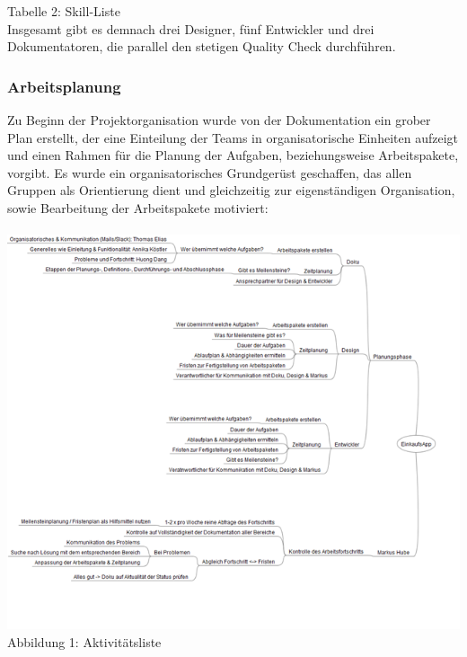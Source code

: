 \documentclass[12pt,a4paper]{article}
\begin{document}
%

\footnotesize Tabelle 2: Skill-Liste
\normalsize
\\
\linebreak
\newline
\newline
Insgesamt gibt es demnach drei Designer, fünf Entwickler und drei Dokumentatoren, die parallel den stetigen Quality Check durchführen.
\newpage

\subsubsection{Arbeitsplanung}
Zu Beginn der Projektorganisation wurde von der Dokumentation ein grober Plan erstellt, der eine Einteilung der Teams in organisatorische Einheiten aufzeigt und einen Rahmen für die Planung der Aufgaben, beziehungsweise Arbeitspakete, vorgibt. 
Es wurde ein organisatorisches Grundgerüst geschaffen, das allen Gruppen als Orientierung dient und gleichzeitig zur eigenständigen Organisation, sowie Bearbeitung der Arbeitspakete motiviert:
\\
\\
\includegraphics[scale=0.6, origin=l]{Aktivitaetsliste.png}
\\
\footnotesize Abbildung 1: Aktivitätsliste
\normalsize
\\
\linebreak
\end{document}
